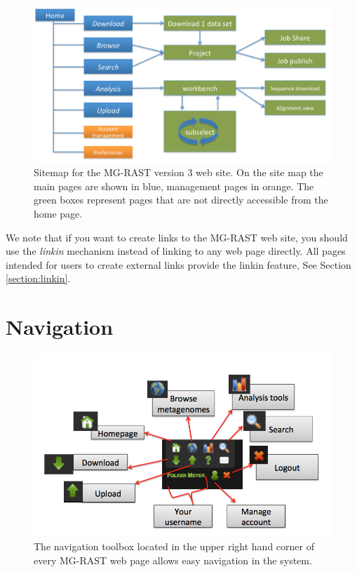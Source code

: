 \documentclass[12pt,fullpage]{report}
\begin{document}
\begin{figure}[ht]
\begin{center}
\includegraphics[width=6in]{Images/sitemap.png}
\end{center}
\caption{
Sitemap for the MG-RAST version 3 web site. On the site map the main pages are shown in blue, management pages in orange. The green boxes represent pages that are not directly accessible from the home page.
}
\label{fig:sitemap}
\end{figure}

We note that if you want to create links to the MG-RAST web site, you should use the \textit{linkin} mechanism instead of linking to any web page directly. All pages intended for users to create external links provide the linkin feature, See Section \ref{section:linkin}.
\section{Navigation}
\label{section:website-navigation}

\begin{figure}[ht]
\begin{center}
\includegraphics[width=6in]{Images/website-navigation-toolbox.png}
\end{center}
\caption{
The navigation toolbox located in the upper right hand corner of every MG-RAST web page allows easy navigation in the system.
}
\label{fig:website-navigation-toolbox}
\end{figure}
\end{document}
